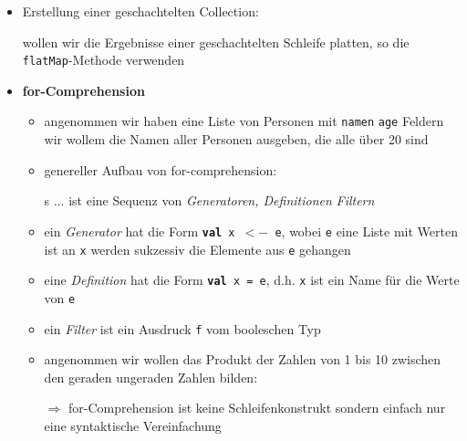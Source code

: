 \begin{itemize}
  \item Erstellung einer geschachtelten Collection:
  
  
  
  wollen wir die Ergebnisse einer geschachtelten Schleife platten, so
  die \texttt{flatMap}-Methode verwenden
  
  \item \textbf{for-Comprehension}
\begin{itemize}
    \item angenommen wir haben eine Liste von Personen mit \texttt{namen} \und 
    \texttt{age} Feldern \und wir wollem die Namen aller Personen ausgeben, die
    alle über 20 sind
    
    
    
    \item genereller Aufbau von for-comprehension:
    
    
    
    s $\ldots$ ist eine Sequenz von \textit{Generatoren, Definitionen} \und 
    \textit{Filtern}
    \item ein \textit{Generator} hat die Form \texttt{\textbf{val} x $<-$ e}, wobei
    \texttt{e} eine Liste mit Werten ist \und an \texttt{x} werden sukzessiv die
    Elemente aus \texttt{e} gehangen
    \item eine \textit{Definition} hat die Form \texttt{\textbf{val} x = e}, d.h. 
    \texttt{x} ist ein Name für die Werte von \texttt{e}
    \item ein \textit{Filter} ist ein Ausdruck \texttt{f} vom booleschen Typ
    \item angenommen wir wollen das Produkt der Zahlen von 1 bis 10
    zwischen den geraden \und ungeraden Zahlen bilden:
    
    
    
    $\Rightarrow$ for-Comprehension ist keine Schleifenkonstrukt sondern
    einfach nur eine syntaktische Vereinfachung
  \end{itemize}
\end{itemize}



